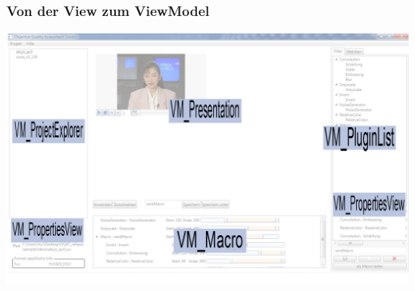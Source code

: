 \documentclass[t]{beamer}
\begin{document}
\begin{frame}
\frametitle{Von der View zum ViewModel}
\begin{center}
\includegraphics[scale=.23]{img/arch/generalOverview.png}
\end{center}
\end{frame}
\end{document}
